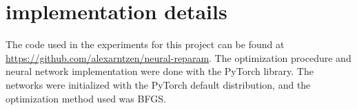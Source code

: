 \appendix
\section{implementation details}
\label{sec:appendix}
The code used in the experiments for this project can be found at \url{https://github.com/alexarntzen/neural-reparam}. The optimization procedure and neural network implementation were done with the PyTorch \cite{PyTorch} library. The networks were initialized with the PyTorch default distribution, and the optimization method used was BFGS. 
